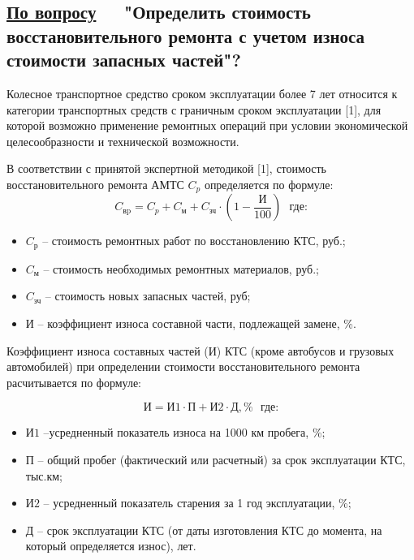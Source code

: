 \subsection{\underline{По  вопросу}\, \, \,	\textbf{\small{"Определить стоимость восстановительного ремонта с учетом износа стоимости запасных частей"?}}}
\renewcommand\baselinestretch{1.2}\small\normalsize
Колесное транспортное средство сроком эксплуатации более 7 лет относится к категории транспортных средств с граничным сроком эксплуатации [1], для которой возможно применение ремонтных операций при условии экономической целесообразности и  технической возможности.  

В соответствии с принятой экспертной методикой [1], стоимость восстановительного ремонта АМТС  $ C_p $ определяется по формуле:
%
\begin{equation}\label{eq:r}
C_\text{вp} =C_p + C_\text{м} + C_\text{зч}\cdot\left( 1-\frac{\text{И}}{100}\right)  \,\,\,\, \text{где:}
\end{equation}
%
%
\begin{itemize}
	\item[ ]$C_\text {р} $ --  стоимость ремонтных работ по восстановлению КТС, руб.;
	\item[ ]$ C_\text{м} $ --  стоимость необходимых ремонтных материалов, руб.;
	\item[ ]$ C_\text{зч} $ --  стоимость новых запасных частей, руб;
	\item[ ] $ \text{И} $ -- коэффициент износа составной части, подлежащей замене, \%.
\end{itemize}
%
%
Коэффициент износа составных частей (И) КТС (кроме автобусов и грузовых автомобилей) при определении стоимости восстановительного ремонта расчитывается по формуле:

\begin{equation}\label{eqsnos}
\text{И} =\text{И1}\cdot\text{П}+\text{И2}\cdot \text{Д}, \%  \,\,\,\, \text{где:}
\end{equation}

\begin{itemize}
	\item [] $ \text{И1} $ --усредненный показатель износа на 1000 км пробега, \%; 
	\item [] $ \text{П} $ -- общий пробег (фактический или расчетный) за срок эксплуатации КТС, тыс.км;
	\item [] $ \text{И2} $ -- усредненный показатель старения за 1 год эксплуатации, \%;
	\item [] $ \text{Д} $ -- срок эксплуатации КТС (от даты изготовления КТС до момента, на который определяется износ), лет. 
\end{itemize}


